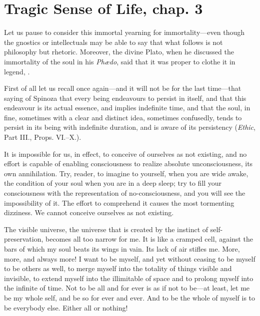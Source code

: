
\author{Miguel de Unamuno}
\chapter[Miguel de Unamuno -- Tragic Sense of Life, chap. 3]{Tragic
Sense of Life, chap. 3}


Let us pause to consider this immortal yearning for
immortality---even though the gnostics or intellectuals may be able to
say that what follows is not philosophy but rhetoric. Moreover, the
divine Plato, when he discussed the immortality of the soul in his
\textit{Ph\ae do}, said that it was proper to clothe it in legend,
.

First of all let us recall once again---and it will not be for the
last time---that saying of Spinoza that every being endeavours to
persist in itself, and that this endeavour is its actual essence, and
implies indefinite time, and that the soul, in fine, sometimes with a
clear and distinct idea, sometimes confusedly, tends to persist in its
being with indefinite duration, and is aware of its persistency
(\textit{Ethic}, Part III., Props. VI.--X.).

It is impossible for us, in effect, to conceive of ourselves as not
existing, and no effort is capable of enabling consciousness to
realize absolute unconsciousness, its own annihilation. Try, reader,
to imagine to yourself, when you are wide awake, the condition of your
soul when you are in a deep sleep; try to fill your consciousness with
the representation of no-consciousness, and you will see the
impossibility of it. The effort to comprehend it causes the most
tormenting dizziness. We cannot conceive ourselves as not existing.

The visible universe, the universe that is created by the instinct of
self-pre\-ser\-va\-tion, becomes all too narrow for me. It is like a
cramped cell, against the bars of which my soul beats its wings in
vain. Its lack of air stifles me. More, more, and always more! I want
to be myself, and yet without ceasing to be myself to be others
 as well, to merge myself into the totality of things visible
and invisible, to extend myself into the illimitable of space and to
prolong myself into the infinite of time. Not to be all and for ever
is as if not to be---at least, let me be my whole self, and be so for
ever and ever. And to be the whole of myself is to be everybody else.
Either all or nothing!

